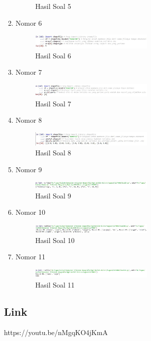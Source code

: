 \begin{enumerate}
\begin{figure}[H]
		\centering
		\caption{Hasil Soal 5}
	\end{figure}
	\item Nomor 6
	
	\begin{figure}[H]
		\includegraphics[width=6cm]{figures/Tugas3/1174066/Soal6.jpg}
		\centering
		\caption{Hasil Soal 6}
	\end{figure}
	\item Nomor 7
	
	\begin{figure}[H]
		\includegraphics[width=6cm]{figures/Tugas3/1174066/Soal7.jpg}
		\centering
		\caption{Hasil Soal 7}
	\end{figure}
	\item Nomor 8
	
	\begin{figure}[H]
		\includegraphics[width=6cm]{figures/Tugas3/1174066/Soal8.jpg}
		\centering
		\caption{Hasil Soal 8}
	\end{figure}
	\item Nomor 9
	
	\begin{figure}[H]
		\includegraphics[width=6cm]{figures/Tugas3/1174066/Soal9.jpg}
		\centering
		\caption{Hasil Soal 9}
	\end{figure}
	\item Nomor 10
	
	\begin{figure}[H]
		\includegraphics[width=6cm]{figures/Tugas3/1174066/Soal10.jpg}
		\centering
		\caption{Hasil Soal 10 }
	\end{figure}
	\item Nomor 11
	
	\begin{figure}[H]
		\includegraphics[width=6cm]{figures/Tugas3/1174066/Soal11.jpg}
		\centering
		\caption{Hasil Soal 11}
	\end{figure}
\end{enumerate}
\subsection{Link}
https://youtu.be/nMgqKO4jKmA